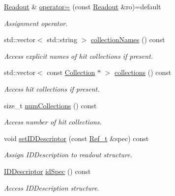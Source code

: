 \begin{DoxyCompactItemize}
\hyperlink{class_d_d4hep_1_1_geometry_1_1_readout}{Readout} \& \hyperlink{class_d_d4hep_1_1_geometry_1_1_readout_a106fe642314da1da418c6b05be898939}{operator=} (const \hyperlink{class_d_d4hep_1_1_geometry_1_1_readout}{Readout} \&ro)=default
\begin{DoxyCompactList}\small\item\em Assignment operator. \end{DoxyCompactList}\item 
std\+::vector$<$ std\+::string $>$ \hyperlink{class_d_d4hep_1_1_geometry_1_1_readout_a960ca3710a0c63d5b22bbcebbb46752e}{collection\+Names} () const
\begin{DoxyCompactList}\small\item\em Access explicit names of hit collections if present. \end{DoxyCompactList}\item 
std\+::vector$<$ const \hyperlink{class_d_d4hep_1_1_geometry_1_1_readout_ac1c39a13ec9bd42d658319fa48cac81d}{Collection} $\ast$ $>$ \hyperlink{class_d_d4hep_1_1_geometry_1_1_readout_a8ec398442eb05aa1c10349e380904f49}{collections} () const
\begin{DoxyCompactList}\small\item\em Access hit collections if present. \end{DoxyCompactList}\item 
size\+\_\+t \hyperlink{class_d_d4hep_1_1_geometry_1_1_readout_a428dd087a41dd1820ef634026aa2e3a7}{num\+Collections} () const
\begin{DoxyCompactList}\small\item\em Access number of hit collections. \end{DoxyCompactList}\item 
void \hyperlink{class_d_d4hep_1_1_geometry_1_1_readout_a81ed73ae7aca9dd1c7527c89026bc1a0}{set\+I\+D\+Descriptor} (const \hyperlink{group___d_d4_h_e_p___g_e_o_m_e_t_r_y_ga40af83be6718bb8828a3d83dc7f8c930}{Ref\+\_\+t} \&spec) const
\begin{DoxyCompactList}\small\item\em Assign I\+D\+Description to readout structure. \end{DoxyCompactList}\item 
\hyperlink{class_d_d4hep_1_1_geometry_1_1_i_d_descriptor}{I\+D\+Descriptor} \hyperlink{class_d_d4hep_1_1_geometry_1_1_readout_a3930f675f87469d26910268c3b7066ca}{id\+Spec} () const
\begin{DoxyCompactList}\small\item\em Access I\+D\+Description structure. \end{DoxyCompactList}\item 

\end{DoxyCompactItemize}
